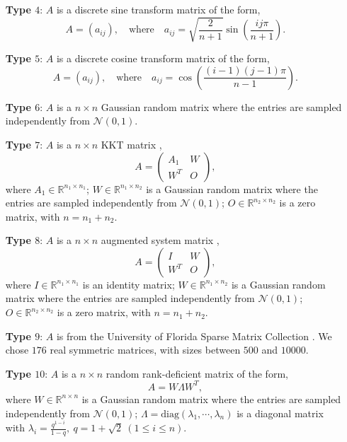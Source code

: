 \documentclass[11pt]{article}
\begin{document}
\begin{itemize}
\item[{\bf Type $4$}:] $A$ is a discrete sine transform matrix of the form,
$$
A = \left(a_{ij}\right), \quad \mbox{where}  \quad a_{ij} = \sqrt{\frac{2}{n + 1}}  \sin \left( \frac{i j \pi}{n + 1} \right).
$$

\item[{\bf Type $5$}:] $A$ is a discrete cosine transform matrix of the form,
$$
A = \left(a_{ij}\right), \quad \mbox{where}  \quad a_{ij} = \cos \left( \frac{(i - 1) (j - 1) \pi}{n - 1} \right).
$$

\item[{\bf Type $6$}:] $A$ is a $n \times n$ Gaussian random matrix where the entries are sampled independently from $\mathcal{N}(0, 1)$.

\item[{\bf Type $7$}:] $A$ is a $n \times n$ KKT matrix \cite{nocedal1999springer},
$$
A = \left(
\begin{array}{cc}
A_1 & W \\
W^T & O 
\end{array}
\right),
$$
where $A_1 \in \mathbb{R}^{n_1\times n_1}$; $W \in \mathbb{R}^{n_1\times n_2}$ is a Gaussian random matrix where the entries are sampled independently from $\mathcal{N}(0, 1)$; $O \in \mathbb{R}^{n_2\times n_2}$ is a zero matrix, with $n = n_1 + n_2$.

\item[{\bf Type $8$}:] $A$ is a $n \times n$ augmented system matrix \cite{higham2002matrix},
$$
A = \left(
\begin{array}{cc}
I & W \\
W^T & O 
\end{array}
\right),
$$
where $I \in \mathbb{R}^{n_1\times n_1}$ is an identity matrix; $W \in \mathbb{R}^{n_1\times n_2}$ is a Gaussian random matrix where the entries are sampled independently from $\mathcal{N}(0, 1)$; $O \in \mathbb{R}^{n_2\times n_2}$ is a zero matrix, with $n = n_1 + n_2$.

\item[{\bf Type $9$}:] $A$ is from the University of Florida Sparse Matrix Collection \cite{davis2011university}. We chose $176$ real symmetric matrices, with sizes between $500$ and $10000$.

\item[{\bf Type $10$}:] $A$ is a $n \times n$ random rank-deficient matrix of the form,
$$
A = W \Lambda W^T,
$$
where $W \in \mathbb{R}^{n\times n}$ is a Gaussian random matrix where the entries are sampled independently from $\mathcal{N}(0, 1)$; $\Lambda = \mbox{diag}(\lambda_1,\cdots, \lambda_n)$ is a diagonal matrix with $\lambda_i = \frac{q^{1-i}}{1-q},~q=1+\sqrt{2}~(1\le i \le n)$. 
\end{itemize}
\end{document}
